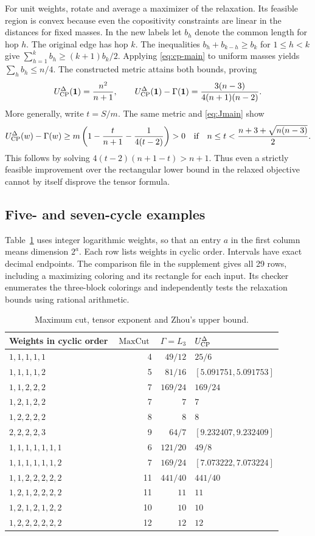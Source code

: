 \documentclass[11pt,a4paper]{article}
\theoremstyle{definition}
\newcommand{\mc}{\operatorname{MaxCut}}
\newcommand{\Zhou}{U_{\rm CP}^{\Delta}}
\begin{document}
For unit weights, rotate and average a maximizer of the relaxation. Its feasible region is convex because even the copositivity constraints are linear in the distances for fixed masses. In the new labels let \(b_h\) denote the common length for hop \(h\). The original edge has hop \(k\). The inequalities \(b_h+b_{k-h}\ge b_k\) for \(1\le h< k\) give \(\sum_{h=1}^k b_h\ge(k+1)b_k/2\). Applying \eqref{eq:cp-main} to uniform masses yields \(\sum_h b_h\le n/4\). The constructed metric attains both bounds, proving
\[
 \Zhou(\mathbf1)=\frac{n^2}{n+1},\qquad
 \Zhou(\mathbf1)-\Gamma(\mathbf1)=\frac{3(n-3)}{4(n+1)(n-2)}.
\]
More generally, write \(t=S/m\). The same metric and \eqref{eq:Jmain} show
\[
 \Zhou(w)-\Gamma(w)\ge
 m\left(1-\frac{t}{n+1}-\frac{1}{4(t-2)}\right)>0
 \quad\text{if}\quad n\le t<\frac{n+3+\sqrt{n(n-3)}}2 .
\]
This follows by solving \(4(t-2)(n+1-t)>n+1\). Thus even a strictly feasible improvement over the rectangular lower bound in the relaxed objective cannot by itself disprove the tensor formula.

\subsection{Five- and seven-cycle examples}

Table~\ref{tab:comparisons} uses integer logarithmic weights, so that an entry \(a\) in the first column means dimension \(2^a\). Each row lists weights in cyclic order. Intervals have exact decimal endpoints. The comparison file in the supplement gives all 29 rows, including a maximizing coloring and its rectangle for each input. Its checker enumerates the three-block colorings and independently tests the relaxation bounds using rational arithmetic.

\begin{table}[ht]
\centering\small
\caption{Maximum cut, tensor exponent and Zhou's upper bound.}\label{tab:comparisons}
\begin{tabular}{@{}lrrl@{}}
\toprule
Weights in cyclic order & \(\mc\) & \(\Gamma=L_3\) & \(\Zhou\)\\
\midrule
\(1,1,1,1,1\) & 4 & \(49/12\) & \(25/6\)\\
\(1,1,1,1,2\) & 5 & \(81/16\) & \([5.091751,5.091753]\)\\
\(1,1,2,2,2\) & 7 & \(169/24\) & \(169/24\)\\
\(1,2,1,2,2\) & 7 & \(7\) & \(7\)\\
\(1,2,2,2,2\) & 8 & \(8\) & \(8\)\\
\(2,2,2,2,3\) & 9 & \(64/7\) & \([9.232407,9.232409]\)\\
\addlinespace
\(1,1,1,1,1,1,1\) & 6 & \(121/20\) & \(49/8\)\\
\(1,1,1,1,1,1,2\) & 7 & \(169/24\) & \([7.073222,7.073224]\)\\
\(1,1,2,2,2,2,2\) & 11 & \(441/40\) & \(441/40\)\\
\(1,2,1,2,2,2,2\) & 11 & \(11\) & \(11\)\\
\(1,2,1,2,1,2,2\) & 10 & \(10\) & \(10\)\\
\(1,2,2,2,2,2,2\) & 12 & \(12\) & \(12\)\\
\bottomrule
\end{tabular}
\end{table}
\end{document}

